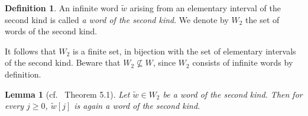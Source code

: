 \documentclass[12pt]{amsart}
\newtheorem{lemma}[theorem]{Lemma}
\theoremstyle{definition}
\newtheorem{definition}[theorem]{Definition}
\renewcommand{\tilde}{\widetilde}
\newcommand{\<}{\langle}   %
\renewcommand{\>}{\rangle} %
\begin{document}
\begin{definition}
    An infinite word $\tilde w$ arising from an elementary interval of the second kind is called \textit{a word of the second kind}. We denote by $W_2$ the set of words of the second kind. 
\end{definition}

It follows that $W_2$ is a finite set, in bijection with the set of elementary intervals of the second kind. Beware that $W_2 \not \subseteq W$, since $W_2$ consists of infinite words by definition. 

\begin{lemma}[cf.~\cite{gelfand-ponomarev:1968} Theorem 5.1]\label{AllShiftsAreWordsOfSecondKind}
    Let $\tilde w \in W_2$ be a word of the second kind. Then for every $j \geq 0$, $\tilde w[j]$ is again a word of the second kind.
\end{lemma}
\end{document}
